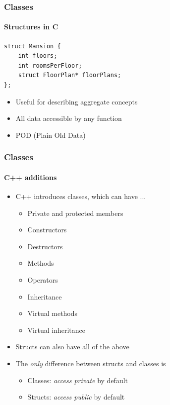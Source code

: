 \documentclass[table]{beamer}
\newcommand{\declarelesson}{\textbf{\color{themegreen}{Lesson:}} }
\begin{document}
\begin{frame}[fragile]
    \frametitle{\declarelesson Classes }
    \framesubtitle{Structures in C}
    \begin{lstlisting}[title=Data in C is usually represented with \texttt{struct}s]
struct Mansion {
    int floors;
    int roomsPerFloor;
    struct FloorPlan* floorPlans;
};
    \end{lstlisting}
    \begin{itemize}
        \item Useful for describing aggregate concepts
        \item All data accessible by any function
        \item POD (Plain Old Data)
    \end{itemize}
\end{frame}

\begin{frame}
    \frametitle{\declarelesson Classes }
    \framesubtitle{C++ additions}
    \begin{itemize}
        \item C++ introduces classes, which can have ...
            \begin{itemize}
                \item Private and protected members
                \item Constructors
                \item Destructors
                \item Methods
                \item Operators
                \item Inheritance
                \item Virtual methods
                \item Virtual inheritance
            \end{itemize}
        \item Structs can also have all of the above
        \item The \emph{only} difference between structs and classes is
            \begin{itemize}
                \item Classes: \emph{access private} by default
                \item Structs: \emph{access public} by default
            \end{itemize}
    \end{itemize}
\end{frame}
\end{document}
